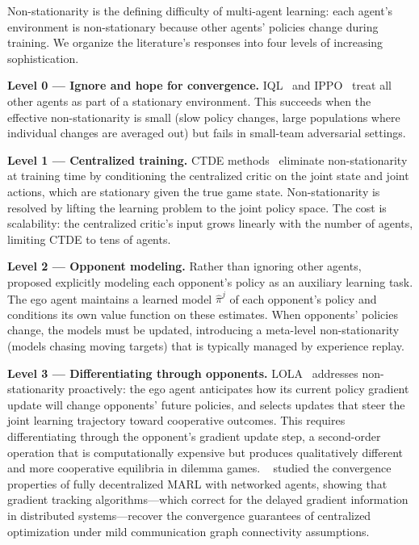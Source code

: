\documentclass[12pt, a4paper]{article}
\begin{document}
Non-stationarity is the defining difficulty of multi-agent learning:
each agent's environment is non-stationary because other agents' policies
change during training.  We organize the literature's responses into four
levels of increasing sophistication.

\textbf{Level 0 --- Ignore and hope for convergence.}  IQL~\cite{tan1993multi}
and IPPO~\cite{de2020independent} treat all other agents as part of a
stationary environment.  This succeeds when the effective non-stationarity
is small (slow policy changes, large populations where individual changes
are averaged out) but fails in small-team adversarial settings.

\textbf{Level 1 --- Centralized training.}  CTDE methods~\cite{kraemer2016multi}
eliminate non-stationarity at training time by conditioning the centralized
critic on the joint state and joint actions, which are stationary given the
true game state.  Non-stationarity is resolved by lifting the learning problem
to the joint policy space.  The cost is scalability: the centralized critic's
input grows linearly with the number of agents, limiting CTDE to tens of agents.

\textbf{Level 2 --- Opponent modeling.}  Rather than ignoring other agents,
\citeauthor{he2016opponent}~\cite{he2016opponent} proposed explicitly modeling
each opponent's policy as an auxiliary learning task.  The ego agent maintains
a learned model $\hat{\pi}^j$ of each opponent's policy and conditions its
own value function on these estimates.  When opponents' policies change, the
models must be updated, introducing a meta-level non-stationarity (models
chasing moving targets) that is typically managed by experience replay.

\textbf{Level 3 --- Differentiating through opponents.}
LOLA~\cite{foerster2018lola} addresses non-stationarity proactively: the
ego agent anticipates how its current policy gradient update will change
opponents' future policies, and selects updates that steer the joint
learning trajectory toward cooperative outcomes.  This requires
differentiating through the opponent's gradient update step, a
second-order operation that is computationally expensive but produces
qualitatively different and more cooperative equilibria in dilemma games.
\citeauthor{zhang2018fully}~\cite{zhang2018fully} studied the convergence
properties of fully decentralized MARL with networked agents, showing that
gradient tracking algorithms---which correct for the delayed gradient
information in distributed systems---recover the convergence guarantees
of centralized optimization under mild communication graph connectivity
assumptions.
\end{document}
